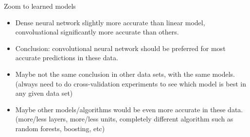\documentclass[12pt]{article}
\begin{document}
{Zoom to learned models}
  \begin{itemize}
  \item Dense neural network slightly more accurate
    than linear model, convoluational significantly more
    accurate than others.
  \item Conclusion: convolutional neural network should be preferred
    for most accurate predictions in these data.
  \item Maybe not the same conclusion in other data sets, with the
    same models. (always need to do cross-validation experiments to
    see which model is best in any given data set)
  \item Maybe other models/algorithms would be even more accurate in
    these data. (more/less layers, more/less units, completely
    different algorithm such as random forests, boosting, etc)
  \end{itemize}
\end{document}
